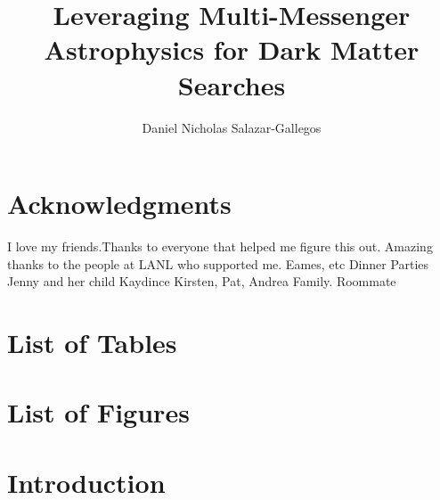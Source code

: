 \documentclass[a4paper, 12pt]{article}
\title{Leveraging Multi-Messenger Astrophysics for Dark Matter Searches}
\author{Daniel Nicholas Salazar-Gallegos}
\begin{document}
\maketitle

\pagebreak


\pagebreak

\section{Acknowledgments}
I love my friends.Thanks to everyone that helped me figure this out.
Amazing thanks to the people at LANL who supported me. Eames, etc
Dinner Parties
Jenny and her child Kaydince
Kirsten, Pat, Andrea
Family.
Roommate

\pagebreak

\tableofcontents

\pagebreak

\section{List of Tables\label{sec:lo_Tbl}}

\section{List of Figures\label{sec:lo_Fig}}

\section{Introduction\label{sec:intro}}
\end{document}
